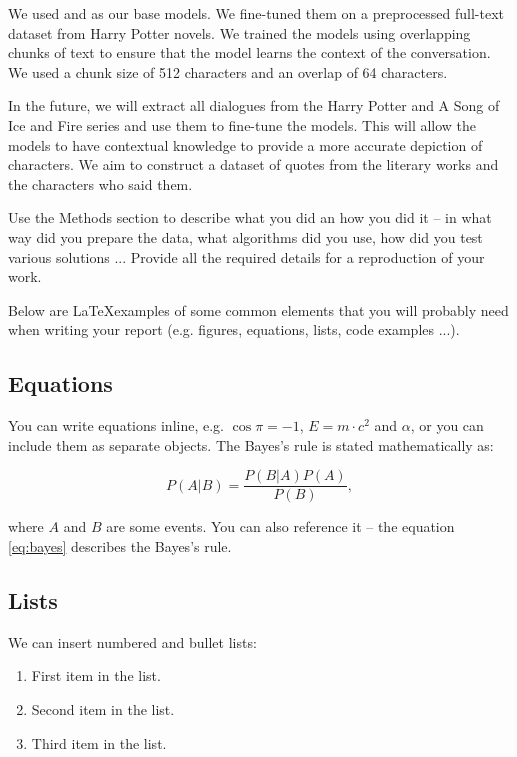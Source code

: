 \documentclass[fleqn,moreauthors,10pt]{ds_report}
\begin{document}
We used \cite{touvron2023llama} and \cite{abdin2024phi} as our base models.
We fine-tuned them on a preprocessed full-text dataset from Harry Potter novels.
We trained the models using overlapping chunks of text to ensure that the model learns the context of the conversation.
We used a chunk size of 512 characters and an overlap of 64 characters.

In the future, we will extract all dialogues from the Harry Potter and A Song of Ice and Fire series and use them to fine-tune the models.
This will allow the models to have contextual knowledge to provide a more accurate depiction of characters.
We aim to construct a dataset of quotes from the literary works and the characters who said them.


Use the Methods section to describe what you did an how you did it -- in what way did you prepare the data, what algorithms did you use, how did you test various solutions ... Provide all the required details for a reproduction of your work.

Below are \LaTeX examples of some common elements that you will probably need when writing your report (e.g. figures, equations, lists, code examples ...).


\subsection*{Equations}

You can write equations inline, e.g. $\cos\pi=-1$, $E = m \cdot c^2$ and $\alpha$, or you can include them as separate objects. The Bayes’s rule is stated mathematically as:

\begin{equation}
	P(A|B) = \frac{P(B|A)P(A)}{P(B)},
	\label{eq:bayes}
\end{equation}

where $A$ and $B$ are some events. You can also reference it -- the equation \ref{eq:bayes} describes the Bayes's rule.

\subsection*{Lists}

We can insert numbered and bullet lists:

\begin{enumerate}[noitemsep]
	\item First item in the list.
	\item Second item in the list.
	\item Third item in the list.
\end{enumerate}
\end{document}
